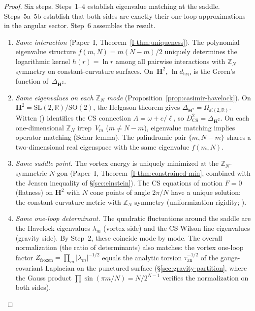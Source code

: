\begin{proof}
Six steps.
Steps~1--4 establish eigenvalue matching at the saddle.
Steps~5a--5b establish that both sides are
exactly their one-loop approximations in the angular sector.
Step~6 assembles the result.

\begin{enumerate}
\item \emph{Same interaction}
  (Paper~I, Theorem~\ref*{I-thm:uniqueness}).
  The polynomial eigenvalue structure
  $f(m,N) = m(N{-}m)/2$ uniquely determines the
  logarithmic kernel $h(r) = \ln r$ among all pairwise
  interactions with $\mathbb{Z}_N$ symmetry on
  constant-curvature surfaces.
  On~$\mathbf{H}^2$, $\ln d_{\mathrm{hyp}}$
  is the Green's function of~$\Delta_{\mathbf{H}^2}$.

\item \emph{Same eigenvalues on each $\mathbb{Z}_N$ mode}
  (Proposition~\ref{prop:casimir-havelock}).
  On $\mathbf{H}^2 = \mathrm{SL}(2,\mathbb{R})/\mathrm{SO}(2)$,
  the Helgason theorem gives
  $\Delta_{\mathbf{H}^2} = \Omega_{\mathfrak{sl}(2,\mathbb{R})}$.
  Witten (\citeyear{Witten1988}) identifies the CS connection
  $A = \omega + e/\ell$, so $D^2_{\mathrm{CS}}
  = \Delta_{\mathbf{H}^2}$.
  On each one-dimensional $\mathbb{Z}_N$ irrep~$V_m$
  ($m \ne N{-}m$), eigenvalue matching implies
  operator matching (Schur lemma).
  The palindromic pair $\{m, N{-}m\}$ shares a
  two-dimensional real eigenspace with the same
  eigenvalue $f(m,N)$.

\item \emph{Same saddle point.}
  The vortex energy is uniquely minimized at the
  $\mathbb{Z}_N$-symmetric $N$-gon
  (Paper~I, Theorem~\ref*{I-thm:constrained-min},
  combined with the Jensen inequality of
  \S\ref{sec:einstein}).
  The CS equations of motion $F = 0$ (flatness) on
  $\mathbf{H}^2$ with $N$ cone points of angle $2\pi/N$
  have a unique solution: the constant-curvature metric
  with $\mathbb{Z}_N$ symmetry
  (uniformization rigidity; \citealt{Troyanov1991}).

\item \emph{Same one-loop determinant.}
  The quadratic fluctuations around the saddle are
  the Havelock eigenvalues $\lambda_m$ (vortex side)
  and the CS Wilson line eigenvalues (gravity side).
  By Step~2, these coincide mode by mode.
  The overall normalization (the ratio of determinants)
  also matches: the vortex one-loop factor
  $Z_{\mathrm{frozen}} = \prod_m |\lambda_m|^{-1/2}$
  equals the analytic torsion
  $\tau_{\mathrm{an}}^{-1/2}$ of the gauge-covariant
  Laplacian on the punctured surface
  (\S\ref{sec:gravity-partition}, where the Gauss product
  $\prod \sin(\pi m/N) = N/2^{N-1}$ verifies the
  normalization on both sides).


\end{enumerate}
\end{proof}
